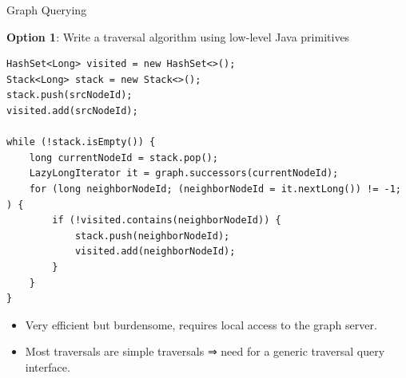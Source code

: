 \documentclass[aspectratio=169,xcolor=table]{beamer}
\begin{document}
    \begin{frame}[fragile]{Graph Querying}
        \begin{block}{}
            \textbf{Option 1}: Write a traversal algorithm using low-level Java
            primitives
        \end{block}
        \begin{verbatim}
HashSet<Long> visited = new HashSet<>();
Stack<Long> stack = new Stack<>();
stack.push(srcNodeId);
visited.add(srcNodeId);

while (!stack.isEmpty()) {
    long currentNodeId = stack.pop();
    LazyLongIterator it = graph.successors(currentNodeId);
    for (long neighborNodeId; (neighborNodeId = it.nextLong()) != -1; ) {
        if (!visited.contains(neighborNodeId)) {
            stack.push(neighborNodeId);
            visited.add(neighborNodeId);
        }
    }
}
        \end{verbatim}
        \begin{block}{}
            \begin{itemize}
                \item Very efficient but burdensome, requires local access to
                    the graph server.
                \item Most traversals are simple traversals ⇒ need for a
                    generic traversal query interface.
            \end{itemize}
        \end{block}
    \end{frame}
\end{document}
